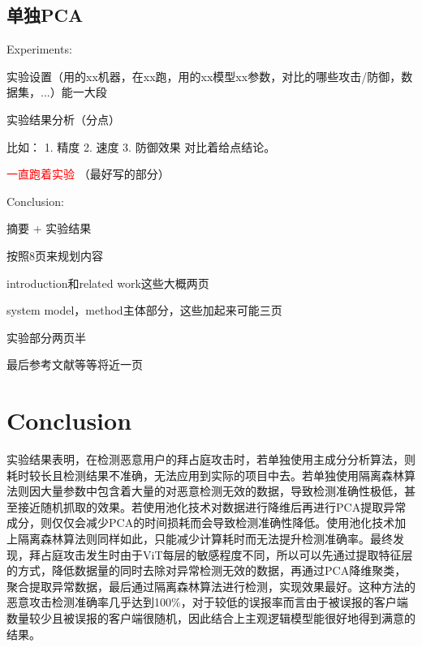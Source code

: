 \documentclass[conference]{IEEEtran}
\begin{document}
\subsection{单独PCA}


Experiments:

实验设置（用的xx机器，在xx跑，用的xx模型xx参数，对比的哪些攻击/防御，数据集，...）能一大段

实验结果分析（分点）

比如：
1. 精度
2. 速度
3. 防御效果
对比着给点结论。

\textcolor{red}{一直跑着实验}
（最好写的部分）


Conclusion:

摘要 + 实验结果



按照8页来规划内容

introduction和related work这些大概两页

system model，method主体部分，这些加起来可能三页

实验部分两页半

最后参考文献等等将近一页

\section{Conclusion}
\label{sec:conclusion}




实验结果表明，在检测恶意用户的拜占庭攻击时，若单独使用主成分分析算法，则耗时较长且检测结果不准确，无法应用到实际的项目中去。若单独使用隔离森林算法则因大量参数中包含着大量的对恶意检测无效的数据，导致检测准确性极低，甚至接近随机抓取的效果。若使用池化技术\cite{betterTogether}对数据进行降维后再进行PCA提取异常成分，则仅仅会减少PCA的时间损耗而会导致检测准确性降低。使用池化技术加上隔离森林算法则同样如此，只能减少计算耗时而无法提升检测准确率。最终发现，拜占庭攻击发生时由于ViT每层的敏感程度不同，所以可以先通过提取特征层的方式，降低数据量的同时去除对异常检测无效的数据，再通过PCA降维聚类，聚合提取异常数据，最后通过隔离森林算法进行检测，实现效果最好。这种方法的恶意攻击检测准确率几乎达到100\%，对于较低的误报率而言由于被误报的客户端数量较少且被误报的客户端很随机，因此结合上主观逻辑模型能很好地得到满意的结果。
\end{document}
